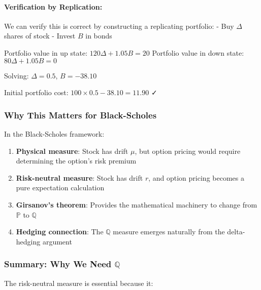 \documentclass[
  letterpaper,
  DIV=11,
  numbers=noendperiod]{scrartcl}
\let\oldparagraph\paragraph
\renewcommand{\paragraph}[1]{\oldparagraph{#1}\mbox{}}
\providecommand{\tightlist}{%
  \setlength{\itemsep}{0pt}\setlength{\parskip}{0pt}}\usepackage{longtable,booktabs,array}
\begin{document}
\begin{tcolorbox}
\hypertarget{verification-by-replication}{%
\paragraph{Verification by
Replication:}\label{verification-by-replication}}

We can verify this is correct by constructing a replicating portfolio: -
Buy \(\Delta\) shares of stock - Invest \(B\) in bonds

Portfolio value in up state: \(120\Delta + 1.05B = 20\) Portfolio value
in down state: \(80\Delta + 1.05B = 0\)

Solving: \(\Delta = 0.5\), \(B = -38.10\)

Initial portfolio cost: \(100 \times 0.5 - 38.10 = 11.90\) ✓

\hypertarget{why-this-matters-for-black-scholes}{%
\subsubsection{Why This Matters for
Black-Scholes}\label{why-this-matters-for-black-scholes}}

In the Black-Scholes framework:

\begin{enumerate}
\def\labelenumi{\arabic{enumi}.}
\tightlist
\item
  \textbf{Physical measure}: Stock has drift \(\mu\), but option pricing
  would require determining the option's risk premium
\item
  \textbf{Risk-neutral measure}: Stock has drift \(r\), and option
  pricing becomes a pure expectation calculation
\item
  \textbf{Girsanov's theorem}: Provides the mathematical machinery to
  change from \(\mathbb{P}\) to \(\mathbb{Q}\)
\item
  \textbf{Hedging connection}: The \(\mathbb{Q}\) measure emerges
  naturally from the delta-hedging argument
\end{enumerate}

\hypertarget{summary-why-we-need-mathbbq}{%
\subsubsection{\texorpdfstring{Summary: Why We Need
\(\mathbb{Q}\)}{Summary: Why We Need \textbackslash mathbb\{Q\}}}\label{summary-why-we-need-mathbbq}}

The risk-neutral measure is essential because it:


\end{tcolorbox}
\end{document}
